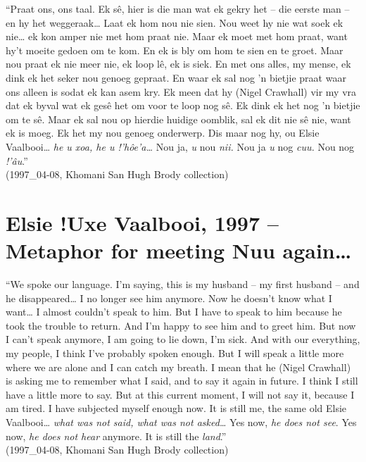 ``Praat ons, ons taal. Ek s\^{e}, hier is die man wat ek gekry het --
die eerste man -- en hy het weggeraak\ldots{} Laat ek hom nou nie sien.
Nou weet hy nie wat soek ek nie\ldots{} ek kon amper nie met hom praat
nie. Maar ek moet met hom praat, want hy't moeite gedoen om te kom. En
ek is bly om hom te sien en te groet. Maar nou praat ek nie meer nie,
ek loop l\^{e}, ek is siek. En met ons alles, my mense, ek dink ek het
seker nou genoeg gepraat. En waar ek sal nog 'n bietjie praat waar ons
alleen is sodat ek kan asem kry. Ek meen dat hy (Nigel Crawhall) vir
my vra dat ek byval wat ek ges\^{e} het om voor te loop nog s\^{e}. Ek
dink ek het nog 'n bietjie om te s\^{e}. Maar ek sal nou op hierdie
huidige oomblik, sal ek dit nie s\^{e} nie, want ek is moeg. Ek het my
nou genoeg onderwerp. Dis maar nog hy, ou Elsie Vaalbooi\ldots{}
\emph{he \textipa{\textdoublevertline}u
\textipa{\textdoublebarpipe}xoa, he \textipa{\textdoublevertline}u
!'h\^{o}e'a\ldots} Nou ja,
\emph{\textipa{\textdoublevertline}u} nou
\emph{n\textipa{\textvertline}ii.}
Nou ja \emph{\textipa{\textdoublevertline}u} nog \emph{cuu.} Nou nog
\emph{!'\^{a}u}.''\\
(1997\_04-08, \textipa{\textdoublebarpipe}Khomani San
\textipa{\textvertline} Hugh Brody collection)


\section*{Elsie !Uxe Vaalbooi, 1997 -- Metaphor for meeting
N\textipa{\textvertline}uu again\ldots}

``We spoke our language. I'm saying, this is my husband -- my first
husband -- and he disappeared\ldots{} I no longer see him anymore. Now
he doesn't know what I want\ldots{} I almost couldn't speak to him.
But I have to speak to him because he took the trouble to return. And
I'm happy to see him and to greet him. But now I can't speak anymore,
I am going to lie down, I'm sick. And with our everything, my people,
I think I've probably spoken enough. But I will speak a little more
where we are alone and I can catch my breath. I mean that he (Nigel
Crawhall) is asking me to remember what I said, and to say it again in
future. I think I still have a little more to say. But at this current
moment, I will not say it, because I am tired. I have subjected myself
enough now. It is still me, the same old Elsie Vaalbooi\ldots{}
\emph{what was not said, what was not asked\ldots{}} Yes now, \emph{he
does not see}. Yes now, \emph{he does not hear} anymore.  It is still
the \emph{land}.''\\
(1997\_04-08, \textipa{\textdoublebarpipe}Khomani San
\textipa{\textvertline} Hugh Brody collection)\\[2cm]


